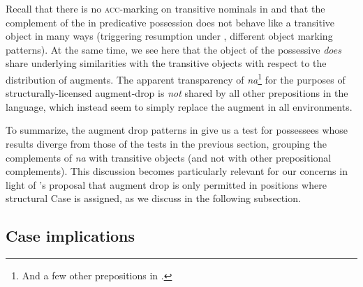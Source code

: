\documentclass[output=paper,
modfonts
]{langscibook}
\begin{document}
\begin{exe}
\begin{xlist}
\end{xlist}
\end{exe}


\largerpage[2]
Recall that there is no \textsc{acc}-marking on transitive nominals
in  and that the complement of the  in predicative
possession does not  behave like a transitive object in many ways
(triggering resumption under , different object marking
patterns). At the same time, we see here that the object of  the possessive 
{\it does} share underlying similarities with the transitive objects
with respect to the distribution of augments. The apparent transparency of {\it na}\footnote{And a few other prepositions in .} for the purposes of structurally-licensed augment-drop  is {\it not}
shared by all other prepositions in the language, which instead seem to simply replace the augment in all environments.  

To summarize, the augment drop patterns in  give us a test for possessees whose results diverge from those of the tests in the previous section, grouping the complements of {\it na} with transitive objects (and not with other prepositional complements).  This discussion becomes particularly relevant for our concerns in light of \citet{Halpert:2012}'s proposal that augment drop is only permitted in positions
where structural Case is assigned, as we discuss in the following subsection.

\subsection{Case implications}
\end{document}
